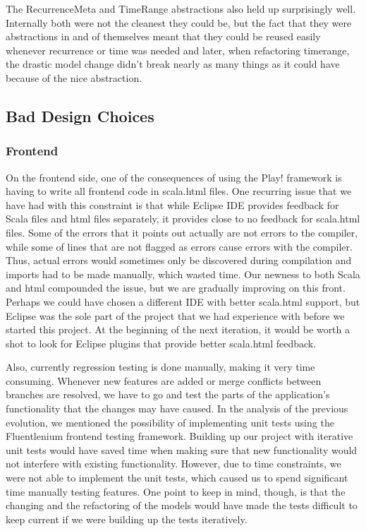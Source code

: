 \documentclass{article}
\begin{document}
The RecurrenceMeta and TimeRange abstractions also held up surprisingly well. Internally both were not the cleanest they could be, but the fact that they were abstractions in and of themselves meant that they could be reused easily whenever recurrence or time was needed and later, when refactoring timerange, the drastic model change didn't break nearly as many things as it could have because of the nice abstraction.

\subsection{Bad Design Choices}
\subsubsection{Frontend}
On the frontend side, one of the consequences of using the Play! framework is having to write all frontend code in scala.html files. One recurring issue that we have had with this constraint is that while Eclipse IDE provides feedback for Scala files and html files separately, it provides close to no feedback for scala.html files. Some of the errors that it points out actually are not errors to the compiler, while some of lines that are not flagged as errors cause errors with the compiler. Thus, actual errors would sometimes only be discovered during compilation and imports had to be made manually, which wasted time. Our newness to both Scala and html compounded the issue, but we are gradually improving on this front. Perhaps we could have chosen a different IDE with better scala.html support, but Eclipse was the sole part of the project that we had experience with before we started this project. At the beginning of the next iteration, it would be worth a shot to look for Eclipse plugins that provide better scala.html feedback.

    Also, currently regression testing is done manually, making it very time consuming. Whenever new features are added or merge conflicts between branches are resolved, we have to go and test the parts of the application's functionality that the changes may have caused. In the analysis of the previous evolution, we mentioned the possibility of implementing unit tests using the Fluentlenium frontend testing framework. Building up our project with iterative unit tests would have saved time when making sure that new functionality would not interfere with existing functionality. However, due to time constraints, we were not able to implement the unit tests, which caused us to spend significant time manually testing features. One point to keep in mind, though, is that the changing and the refactoring of the models would have made the tests difficult to keep current if we were building up the tests iteratively.
\end{document}
